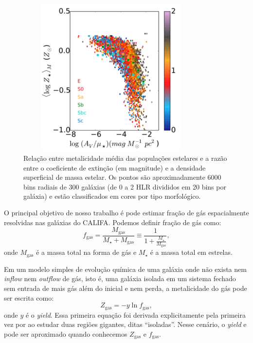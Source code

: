 \begin{figure}
	\centering
	\includegraphics[height = 8cm, width = 9.5cm]{figuras/dust2stars.pdf}
	\caption[$A_V / \mu_\star$ vs. ]
	{Relação entre metalicidade média das populações estelares e a razão entre o coeficiente de
extinção (em magnitude) e a densidade superficial de massa estelar. Os pontos são aproximadamente
6000 bins radiais de 300 galáxias (de 0 a 2 HLR divididos em 20 bins por galáxia) e estão
classificados em cores por tipo morfológico.}
	\label{fig:dust2stars}
\end{figure}

O principal objetivo de nosso trabalho é pode estimar fração de gás espacialmente resolvidas nas
galáxias do CALIFA. Podemos definir fração de gás como:
\begin{equation}
	f_{\mathrm{gas}} = \frac{M_{\mathrm{gas}}}{M_\star + M_{\mathrm{gas}}} \equiv \frac{1}{1 +
	\frac{M_\star}{M_{\mathrm{gas}}}},
	\label{eq:fgas}
\end{equation}
\noindent onde $M_{\mathrm{gas}}$ é a massa total na forma de gás e $M_\star$ é a massa total em
estrelas. 

Em um modelo simples de evolução química de uma galáxia onde não exista nem {\em inflow} nem {\em
outflow} de gás, isto é, uma galáxia isolada em um sistema fechado sem entrada de mais gás além do
inicial e nem perda, a metalicidade do gás pode ser escrita como:
\begin{equation}
	Z_{\mathrm{gas}} = - y \ln f_{\mathrm{gas}},
	\label{eq:Zgas_closedbox}
\end{equation}
\noindent onde $y$ é o {\em yield}. Essa primeira equação foi derivada explicitamente pela primeira
vez por \citet{Searle.Sargent.1972a} ao estudar duas regiões \Hii gigantes, ditas ``isoladas''.
Nesse cenário, o {\em yield} e pode ser aproximado quando conhecemos $Z_{\mathrm{gas}}$ e
$f_{\mathrm{gas}}$.

